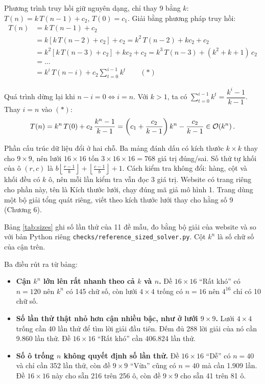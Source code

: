 Phương trình truy hồi giữ nguyên dạng, chỉ thay 9 bằng \(k\): \(T(n) = k\,T(n - 1) + c_2\), \(T(0) = c_1\). Giải bằng phương pháp truy hồi:
\begin{align*}
  T(n) &= k\,T(n-1) + c_2 \\
       &= k\left[k\,T(n-2) + c_2\right] + c_2 = k^2\,T(n-2) + k c_2 + c_2 \\
       &= k^2\left[k\,T(n-3) + c_2\right] + k c_2 + c_2 = k^3\,T(n-3) + (k^2 + k + 1)\,c_2 \\
       &= \ldots \\
       &= k^i\,T(n-i) + c_2 \sum_{t=0}^{i-1} k^t \qquad (*)
\end{align*}

Quá trình dừng lại khi \(n - i = 0 \iff i = n\). Với \(k > 1\), ta có \(\sum_{t=0}^{i-1} k^t = \dfrac{k^i - 1}{k - 1}\). Thay \(i = n\) vào \((*)\):
\[
  T(n) = k^n\,T(0) + c_2\,\frac{k^n - 1}{k - 1} = \left(c_1 + \frac{c_2}{k - 1}\right) k^n - \frac{c_2}{k - 1} \in \mathcal{O}\!\left(k^n\right) .
\]

Phần cấu trúc dữ liệu đổi ở hai chỗ. Ba mảng đánh dấu có kích thước \(k \times k\) thay cho \(9 \times 9\), nên lưới \(16 \times 16\) tốn \(3 \times 16 \times 16 = 768\) giá trị đúng/sai. Số thứ tự khối của ô \((r, c)\) là \(b\left\lfloor \frac{r-1}{b} \right\rfloor + \left\lfloor \frac{c-1}{b} \right\rfloor + 1\). Cách kiểm tra không đổi: hàng, cột và khối đều có \(k\) ô, nên mỗi lần kiểm tra vẫn đọc 3 giá trị. Website có trang riêng cho phần này, tên là Kích thước lưới, chạy đúng mã giả mô hình 1. Trang dùng một bộ giải tổng quát riêng, viết theo kích thước lưới thay cho hằng số 9 (Chương 6).

Bảng \ref{tab:sizes} ghi số lần thử của 11 đề mẫu, đo bằng bộ giải của website và so với bản Python riêng \texttt{checks/reference\_sized\_solver.py}. Cột \(k^n\) là số chữ số của cận trên.

\begin{table}[H]
  \centering
  \caption{Số lần thử theo kích thước lưới (điền ô theo hàng rồi cột)}
  \label{tab:sizes}
  \small
  
\end{table}

Ba điều rút ra từ bảng:

\begin{itemize}
  \item \textbf{Cận \(k^n\) lớn lên rất nhanh theo cả \(k\) và \(n\).} Đề \(16 \times 16\) ``Rất khó'' có \(n = 120\) nên \(k^n\) có 145 chữ số, còn lưới \(4 \times 4\) trống có \(n = 16\) nên \(4^{16}\) chỉ có 10 chữ số.
  \item \textbf{Số lần thử thật nhỏ hơn cận nhiều bậc, như ở lưới \(9 \times 9\).} Lưới \(4 \times 4\) trống cần 40 lần thử để tìm lời giải đầu tiên. Đếm đủ 288 lời giải của nó cần 9.860 lần thử. Đề \(16 \times 16\) ``Rất khó'' cần 406.824 lần thử.
  \item \textbf{Số ô trống \(n\) không quyết định số lần thử.} Đề \(16 \times 16\) ``Dễ'' có \(n = 40\) và chỉ cần 352 lần thử, còn đề \(9 \times 9\) ``Vừa'' cũng có \(n = 40\) mà cần 1.909 lần. Đề \(16 \times 16\) này cho sẵn 216 trên 256 ô, còn đề \(9 \times 9\) cho sẵn 41 trên 81 ô.
\end{itemize}

